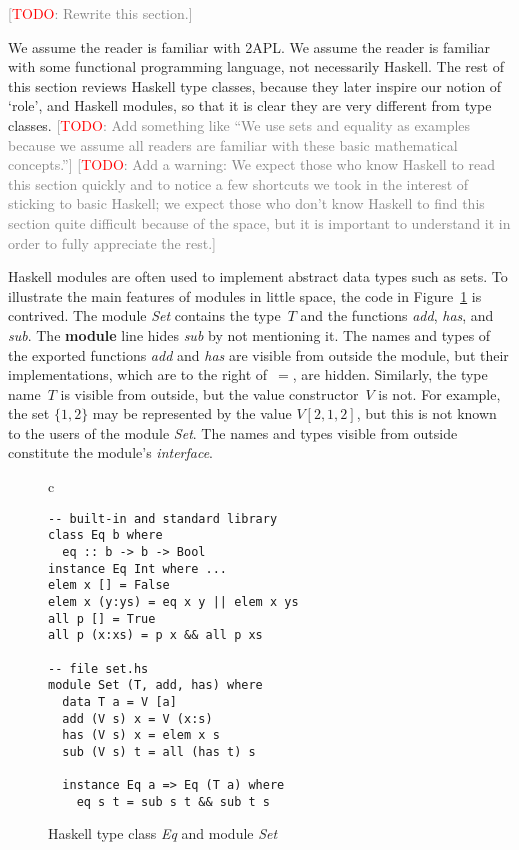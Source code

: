 \documentclass[conference,compsoc]{IEEEtran} %
\newcommand{\todo}[1]{{\small \textcolor{gray}{[\textcolor{red}{TODO}: #1]}}}
\begin{document}
\todo{Rewrite this section.}

We assume the reader is familiar with 2APL. We assume the reader is
familiar with some functional programming language, not necessarily Haskell.
The rest of this section reviews Haskell type classes, because they later
inspire our notion of `role', and Haskell modules, so that it is clear they
are very different from type classes. \todo{Add something like ``We use
sets and equality as examples because we assume all readers are familiar
with these basic mathematical concepts.''} \todo{Add a warning: We expect
those who know Haskell to read this section quickly and to notice a few
shortcuts we took in the interest of sticking to basic Haskell; we expect
those who don't know Haskell to find this section quite difficult because
of the space, but it is important to understand it in order to fully
appreciate the rest.}


Haskell modules are often used to implement abstract data types such as
sets.  To illustrate the main features of modules in little space, the code
in Figure~\ref{fig:haskell} is contrived.  The module \textit{Set} contains
the type~$T$ and the functions \textit{add}, \textit{has}, and
\textit{sub}. The \textbf{module} line hides \textit{sub} by not mentioning
it. The names and types of the exported functions \textit{add} and
\textit{has} are visible from outside the module, but their
implementations, which are to the right of~$=$, are hidden.  Similarly, the
type name~$T$ is visible from outside, but the value constructor~$V$ is
not. For example, the set $\{1,2\}$ may be represented by the value
$V[2,1,2]$, but this is not known to the users of the module \textit{Set}.
The names and types visible from outside constitute the module's
\emph{interface}.

\begin{figure}\footnotesize %
\begin{center}
\begin{tabular}{c}
\begin{lstlisting}[style=hs]
-- built-in and standard library
class Eq b where
  eq :: b -> b -> Bool
instance Eq Int where ...
elem x [] = False
elem x (y:ys) = eq x y || elem x ys
all p [] = True
all p (x:xs) = p x && all p xs

-- file set.hs
module Set (T, add, has) where
  data T a = V [a]
  add (V s) x = V (x:s)
  has (V s) x = elem x s
  sub (V s) t = all (has t) s

  instance Eq a => Eq (T a) where
    eq s t = sub s t && sub t s
\end{lstlisting}
\end{tabular}
\end{center}
\caption{Haskell type class \textit{Eq} and module \textit{Set}}
\label{fig:haskell}
\end{figure} %
\end{document}
